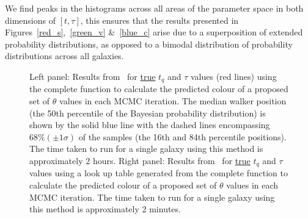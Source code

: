 We find peaks in the histograms across all areas of the parameter space in both dimensions of $[t, \tau]$, this ensures that the results presented in Figures~\ref{red_s},~\ref{green_v} \&~\ref{blue_c} arise due to a superposition of extended probability distributions, as opposed to a bimodal distribution of probability distributions across all galaxies.


\begin{figure}
\caption[Comparing complete and look-up table versions of \starpy]{Left panel: Results from \starpy ~for \underline{true} $t_q$ and $\tau$ values (red lines) using the complete function to calculate the predicted colour of a proposed set of $\theta$ values in each MCMC iteration. The median walker position (the 50th percentile of the Bayesian probability distribution) is shown by the solid blue line with the dashed lines encompassing $68\% (\pm 1\sigma)$ of the samples (the 16th and 84th percentile positions). The time taken to run for a single galaxy using this method is approximately 2 hours. Right panel: Results from \starpy ~for \underline{true} $t_q$ and $\tau$ values using a look up table generated from the complete function to calculate the predicted colour of a proposed set of $\theta$ values in each MCMC iteration. The time taken to run for a single galaxy using this method is approximately 2 minutes.}
\label{lookup}
\end{figure}

